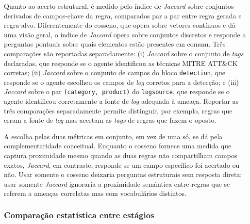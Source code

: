Quanto ao acerto estrutural, é medido pelo índice de \textit{Jaccard} sobre conjuntos derivados de campos-chave da regra, comparados par a par entre regra gerada e regra-alvo. 
Diferentemente do cosseno, que opera sobre vetores contínuos e dá uma visão geral, o índice de \textit{Jaccard} opera sobre conjuntos discretos e responde a perguntas pontuais sobre quais elementos estão presentes em comum. 
Três comparações são reportadas separadamente: (i) \textit{Jaccard} sobre o conjunto de \textit{tags} declaradas, que responde se o agente identificou as técnicas MITRE ATT\&CK corretas; (ii) \textit{Jaccard} sobre o conjunto de campos do bloco \texttt{detection}, que responde se o agente escolheu os campos de \textit{log} corretos para a detecção; e (iii) \textit{Jaccard} sobre o par \texttt{(category, product)} do \texttt{logsource}, que responde se o agente identificou corretamente a fonte de \textit{log} adequada à ameaça. 
Reportar as três comparações separadamente permite distinguir, por exemplo, regras que erram a fonte de \textit{log} mas acertam as \textit{tags} de regras que fazem o oposto.

A escolha pelas duas métricas em conjunto, em vez de uma só, se dá pela complementaridade conceitual. 
Enquanto o cosseno fornece uma medida que captura proximidade mesmo quando as duas regras não compartilham campos exatos, \textit{Jaccard}, em contraste, responde se um campo específico foi acertado ou não. 
Usar somente o cosseno deixaria perguntas estruturais sem resposta direta; usar somente \textit{Jaccard} ignoraria a proximidade semântica entre regras que se referem a ameaças correlatas mas com vocabulários distintos. 


\subsubsection{Comparação estatística entre estágios}





